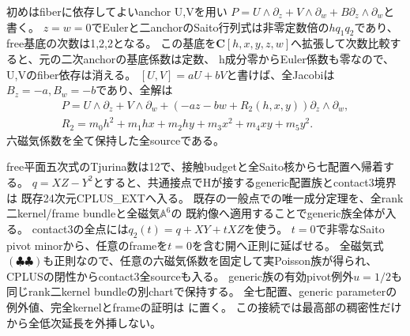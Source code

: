 \documentclass[a4paper,11pt]{ltjsarticle}
\theoremstyle{definition}
\newcommand{\CC}{\mathbf C}
\begin{document}
初めはfiberに依存してよいanchor U,Vを用い
$P=U\wedge\partial_z+V\wedge\partial_w+B\partial_z\wedge\partial_w$と書く。
$z=w=0$でEulerと二anchorのSaito行列式は非零定数倍の$hq_1q_2$であり、
free基底の次数は1,2,2となる。
この基底を$\CC[h,x,y,z,w]$へ拡張して次数比較すると、元の二次anchorの基底係数は定数、
h成分零からEuler係数も零なので、U,Vのfiber依存は消える。
$[U,V]=aU+bV$と書けば、全Jacobiは$B_z=-a,B_w=-b$であり、全解は
\[
\begin{gathered}
 P=U\wedge\partial_z+V\wedge\partial_w+
       (-az-bw+R_2(h,x,y))\partial_z\wedge\partial_w,\\
 R_2=m_0h^2+m_1hx+m_2hy+m_3x^2+m_4xy+m_5y^2.
\end{gathered}                                             \tag{\clubsuit\clubsuit}
\]
六磁気係数を全て保持した全sourceである。

free平面五次式のTjurina数は12で、接触budgetと全Saito核から七配置へ帰着する。
$q=XZ-Y^2$とすると、共通接点でHが接するgeneric配置族とcontact3境界は
既存24次元CPLUS\_EXTへ入る。
既存の一般点での唯一成分定理を、全rank二kernel/frame bundleと全磁気$\mathbb A^6$の
既約像へ適用することでgeneric族全体が入る。
contact3の全点には$q_2(t)=q+XY+tXZ$を使う。
$t=0$で非零なSaito pivot minorから、任意のframeを$t=0$を含む開へ正則に延ばせる。
全磁気式$(\clubsuit\clubsuit)$も正則なので、任意の六磁気係数を固定して実Poisson族が得られ、
CPLUSの閉性からcontact3全sourceも入る。
generic族の有効pivot例外$u=1/2$も同じrank二kernel bundleの別chartで保持する。
全七配置、generic parameterの例外値、完全kernelとframeの証明は
に置く。
この接続では最高部の稠密性だけから全低次延長を外挿しない。
\end{document}
